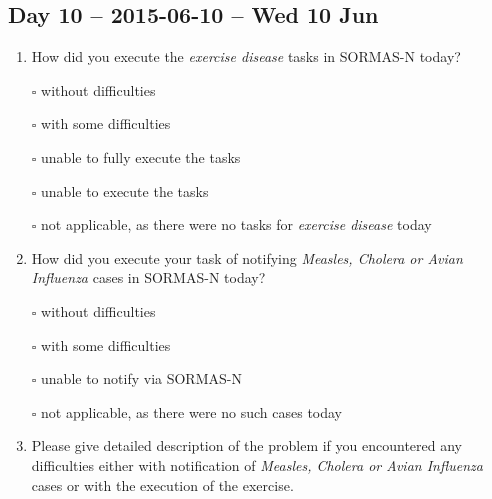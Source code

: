 \documentclass[a4paper, titlepage]{tufte-handout}
\begin{document}
\subsection{Day 10 -- 2015-06-10 -- Wed 10 Jun}
\label{sec-8-8}
\begin{enumerate}
\item How did you execute the \emph{exercise disease} tasks in SORMAS-N today?

\quad $\square$ without difficulties

\quad $\square$ with some difficulties

\quad $\square$ unable to fully execute the tasks

\quad $\square$ unable to execute the tasks

\quad $\square$ not applicable, as there were no tasks for \emph{exercise disease} today

\item How did you execute your task of notifying \emph{Measles, Cholera or Avian Influenza} cases in SORMAS-N today?

\quad $\square$ without difficulties

\quad $\square$ with some difficulties

\quad $\square$ unable to notify via SORMAS-N

\quad $\square$ not applicable, as there were no such cases today

\item Please give detailed description of the problem if you encountered any difficulties either with notification of \emph{Measles, Cholera or Avian Influenza} cases or with the execution of the exercise.

\hrulefill

\hrulefill

\hrulefill

\hrulefill

\hrulefill

\hrulefill

\hrulefill

\hrulefill

\hrulefill

\hrulefill
\end{enumerate}

\newpage
\end{document}
